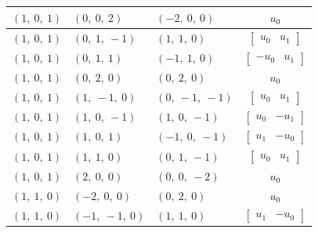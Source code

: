 \documentclass[11pt]{article}
\theoremstyle{definition}
\begin{document}
\begin{longtable}{|l|l|l|c|}
    \hline
    $\left( 1, \  0, \  1\right)$ & $\left( 0, \  0, \  2\right)$ & $\left( -2, \  0, \  0\right)$ & $u_{0}$ \\
    \hline
    $\left( 1, \  0, \  1\right)$ & $\left( 0, \  1, \  -1\right)$ & $\left( 1, \  1, \  0\right)$ & $\left[\begin{matrix}u_{0} & u_{1}\end{matrix}\right]$ \\
    \hline
    $\left( 1, \  0, \  1\right)$ & $\left( 0, \  1, \  1\right)$ & $\left( -1, \  1, \  0\right)$ & $\left[\begin{matrix}- u_{0} & u_{1}\end{matrix}\right]$ \\
    \hline
    $\left( 1, \  0, \  1\right)$ & $\left( 0, \  2, \  0\right)$ & $\left( 0, \  2, \  0\right)$ & $u_{0}$ \\
    \hline
    $\left( 1, \  0, \  1\right)$ & $\left( 1, \  -1, \  0\right)$ & $\left( 0, \  -1, \  -1\right)$ & $\left[\begin{matrix}u_{0} & u_{1}\end{matrix}\right]$ \\
    \hline
    $\left( 1, \  0, \  1\right)$ & $\left( 1, \  0, \  -1\right)$ & $\left( 1, \  0, \  -1\right)$ & $\left[\begin{matrix}u_{0} & - u_{1}\end{matrix}\right]$ \\
    \hline
    $\left( 1, \  0, \  1\right)$ & $\left( 1, \  0, \  1\right)$ & $\left( -1, \  0, \  -1\right)$ & $\left[\begin{matrix}u_{1} & - u_{0}\end{matrix}\right]$ \\
    \hline
    $\left( 1, \  0, \  1\right)$ & $\left( 1, \  1, \  0\right)$ & $\left( 0, \  1, \  -1\right)$ & $\left[\begin{matrix}u_{0} & u_{1}\end{matrix}\right]$ \\
    \hline
    $\left( 1, \  0, \  1\right)$ & $\left( 2, \  0, \  0\right)$ & $\left( 0, \  0, \  -2\right)$ & $u_{0}$ \\
    \hline
    $\left( 1, \  1, \  0\right)$ & $\left( -2, \  0, \  0\right)$ & $\left( 0, \  2, \  0\right)$ & $u_{0}$ \\
    \hline
    $\left( 1, \  1, \  0\right)$ & $\left( -1, \  -1, \  0\right)$ & $\left( 1, \  1, \  0\right)$ & $\left[\begin{matrix}u_{1} & - u_{0}\end{matrix}\right]$ \\

\end{longtable}
\end{document}

